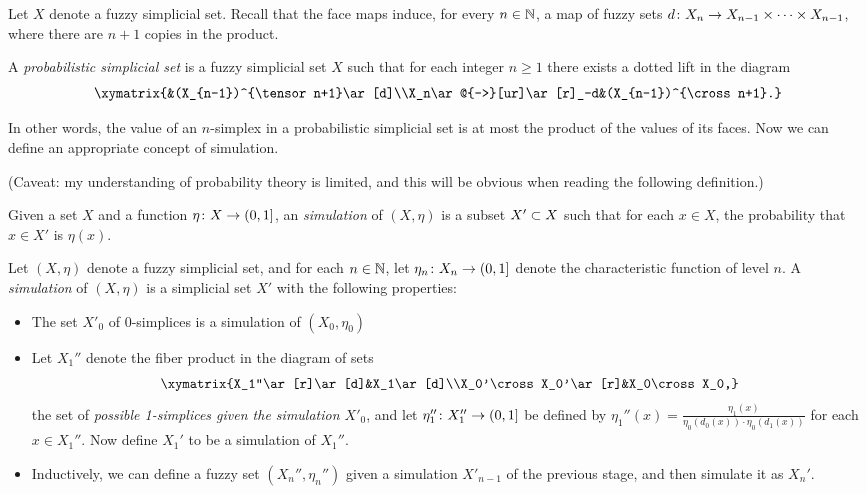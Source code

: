 \documentclass{amsart}
\begin{document}
Let $X$ denote a fuzzy simplicial set.  Recall that the face maps induce, for every $n\in\NN$, a map of fuzzy sets $d\taking X_n\to X_{n-1}\cross\cdots\cross X_{n-1}$, where there are $n+1$ copies in the product.

\begin{definition}

A {\em probabilistic simplicial set} is a fuzzy simplicial set $X$ such that for each integer $n\geq 1$ there exists a dotted lift in the diagram $$\xymatrix{&(X_{n-1})^{\tensor n+1}\ar[d]\\X_n\ar@{-->}[ur]\ar[r]_-d&(X_{n-1})^{\cross n+1}.}$$

\end{definition}

In other words, the value of an $n$-simplex in a probabilistic simplicial set is at most the product of the values of its faces.  Now we can define an appropriate concept of simulation.

(Caveat: my understanding of probability theory is limited, and this will be obvious when reading the following definition.)

\begin{definition}

Given a set $X$ and a function $\eta\taking X\to(0,1]$, an {\em simulation} of $(X,\eta)$ is a subset $X'\ss X$ such that for each $x\in X$, the probability that $x\in X'$ is $\eta(x)$.  

\end{definition}

\begin{definition}

Let $(X,\eta)$ denote a fuzzy simplicial set, and for each $n\in\NN$, let $\eta_n\taking X_n\to (0,1]$ denote the characteristic function of level $n$.  A {\em simulation} of $(X,\eta)$ is a simplicial set $X'$ with the following properties: \begin{itemize} \item The set $X'_0$ of 0-simplices is a simulation of $(X_0,\eta_0)$ \item Let $X_1''$ denote the fiber product in the diagram of sets $$\xymatrix{X_1''\ar[r]\ar[d]&X_1\ar[d]\\X_0'\cross X_0'\ar[r]&X_0\cross X_0,}$$ the set of {\em possible 1-simplices given the simulation $X'_0$}, and let $\eta_1''\taking X_1''\to(0,1]$ be defined by $\eta_1''(x)=\frac{\eta_1(x)}{\eta_0(d_0(x))\cdot\eta_0(d_1(x))}$ for each $x\in X_1''$.  Now define $X_1'$ to be a simulation of $X_1''$.\item Inductively, we can define a fuzzy set $(X_n'',\eta_n'')$ given a simulation $X'_{n-1}$ of the previous stage, and then simulate it as $X_n'$.

\end{itemize}

\end{definition}
\end{document}
